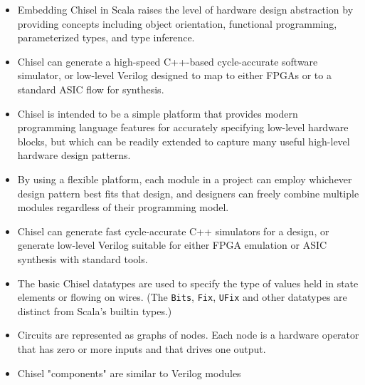 \documentclass{beamer}
\begin{document}
\begin{frame}
\begin{itemize}

\item Embedding Chisel in Scala raises the level of hardware design abstraction by providing concepts including object orientation, functional programming, parameterized types, and type inference.

\item Chisel can generate a high-speed C++-based cycle-accurate software simulator, or low-level Verilog designed to map to either FPGAs or to a standard ASIC flow for synthesis.

\end{itemize}
\end{frame}

\begin{frame}
\begin{itemize}

\item Chisel is intended to be a simple platform that provides modern programming language features for accurately specifying low-level hardware blocks, but which can be readily extended to capture many useful high-level hardware design patterns.

\item By using a flexible platform, each module in a project can employ whichever design pattern best fits that design, and designers can freely combine multiple modules regardless of their programming model.

\item Chisel can generate fast cycle-accurate C++ simulators for a design, or generate low-level Verilog suitable for either FPGA emulation or ASIC synthesis with standard tools.

\end{itemize}
\end{frame}

\begin{frame}
\begin{itemize}

\item The basic Chisel datatypes are used to specify the type of values held in state elements or flowing on wires. (The \texttt{Bits}, \texttt{Fix}, \texttt{UFix} and other datatypes are distinct from Scala's builtin types.)

\item Circuits are represented as graphs of nodes. Each node is a hardware operator that has zero or more inputs and that drives one output.

\item Chisel "components" are similar to Verilog modules

\end{itemize}
\end{frame}
\end{document}

